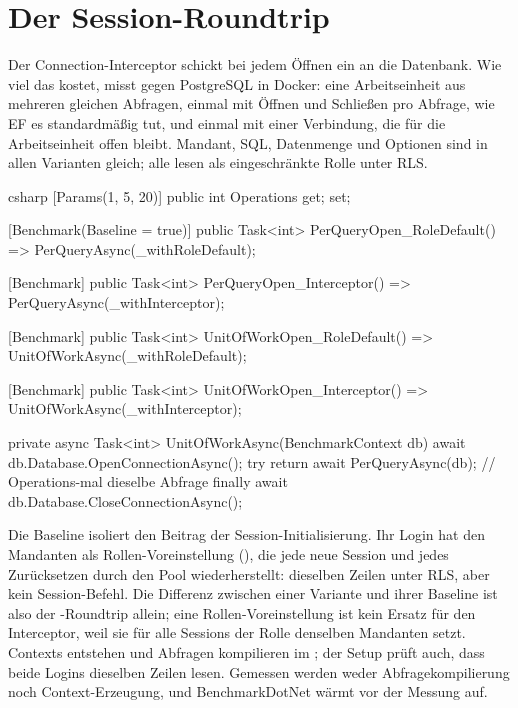 \section{Der Session-Roundtrip}

Der Connection-Interceptor schickt bei jedem Öffnen ein  an die Datenbank.
Wie viel das kostet, misst  gegen
PostgreSQL in Docker: eine Arbeitseinheit aus mehreren gleichen Abfragen, einmal mit Öffnen
und Schließen pro Abfrage, wie EF es standardmäßig tut, und einmal mit einer Verbindung, die
für die Arbeitseinheit offen bleibt. Mandant, SQL, Datenmenge und Optionen sind in allen
Varianten gleich; alle lesen als eingeschränkte Rolle unter RLS.

\begin{sourcecode}{csharp}
[Params(1, 5, 20)]
public int Operations { get; set; }

[Benchmark(Baseline = true)]
public Task<int> PerQueryOpen_RoleDefault() => PerQueryAsync(_withRoleDefault);

[Benchmark]
public Task<int> PerQueryOpen_Interceptor() => PerQueryAsync(_withInterceptor);

[Benchmark]
public Task<int> UnitOfWorkOpen_RoleDefault() => UnitOfWorkAsync(_withRoleDefault);

[Benchmark]
public Task<int> UnitOfWorkOpen_Interceptor() => UnitOfWorkAsync(_withInterceptor);

private async Task<int> UnitOfWorkAsync(BenchmarkContext db)
{
    await db.Database.OpenConnectionAsync();
    try
    {
        return await PerQueryAsync(db);       // Operations-mal dieselbe Abfrage
    }
    finally
    {
        await db.Database.CloseConnectionAsync();
    }
}
\end{sourcecode}

Die Baseline isoliert den Beitrag der Session-Initialisierung. Ihr Login hat den Mandanten als
Rollen-Voreinstellung (), die jede neue Session und
jedes Zurücksetzen durch den Pool wiederherstellt: dieselben Zeilen unter RLS, aber kein
Session-Befehl. Die Differenz zwischen einer Variante und ihrer Baseline ist also der
-Roundtrip allein; eine Rollen-Voreinstellung ist kein Ersatz für den
Interceptor, weil sie für alle Sessions der Rolle denselben Mandanten setzt. Contexts entstehen
und Abfragen kompilieren im ; der Setup prüft auch, dass beide
Logins dieselben Zeilen lesen. Gemessen werden weder Abfragekompilierung noch Context-Erzeugung,
und BenchmarkDotNet wärmt vor der Messung auf.

